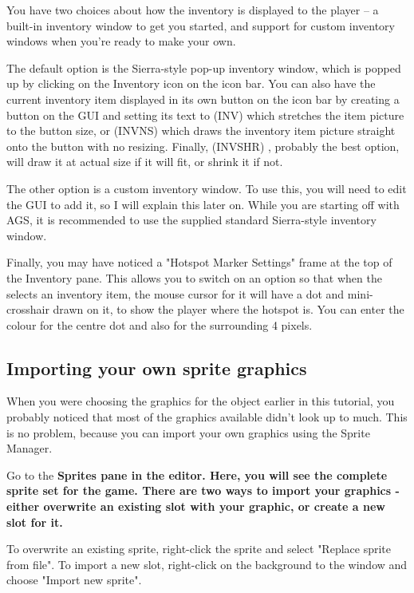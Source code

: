 You have two choices about how the inventory is displayed to the player -- a
built-in inventory window to get you started, and support for custom inventory
windows when you're ready to make your own.

The default option is the Sierra-style pop-up inventory window, which is
popped up by clicking on the Inventory icon on the icon bar. You can also have
the current inventory item displayed in its own button on the icon bar by creating
a button on the GUI and setting its text to  (INV)  which stretches the item
picture to the button size, or  (INVNS)  which draws the inventory item
picture straight onto the button with no resizing. Finally, (INVSHR) , probably
the best option, will draw it at actual size if it will fit, or shrink it if not.

The other option is a custom inventory window. To use this, you
will need to edit the GUI to add it, so I will explain this later on.
While you are starting off with AGS, it is recommended to use the supplied
standard Sierra-style inventory window.

Finally, you may have noticed a "Hotspot Marker Settings" frame at the top of the
Inventory pane. This allows you to switch on an option so that when the
selects an inventory item, the mouse cursor for it will have a dot and mini-crosshair
drawn on it, to show the player where the hotspot is.
You can enter the colour for the centre dot and also for the surrounding 4 pixels.

\subsection{Importing your own sprite graphics}%

When you were choosing the graphics for the object earlier in this tutorial,
you probably noticed that most of the graphics available didn't look up to
much. This is no problem, because you can import your own graphics using
the Sprite Manager.

Go to the \bf{Sprites} pane in the editor. Here, you will see
the complete sprite set for the game. There are two ways to import your
graphics - either overwrite an existing slot with your graphic, or
create a new slot for it.

To overwrite an existing sprite, right-click the sprite and select "Replace sprite
from file". To import a new slot, right-click on the background to the window
and choose "Import new sprite".

